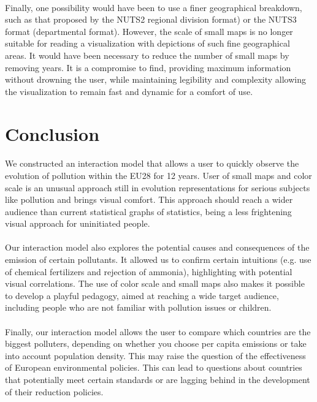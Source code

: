 \documentclass[preprint,journal]{vgtc}       %
\begin{document}
\paragraph{}
Finally, one possibility would have been to use a finer geographical breakdown, such as that proposed by the NUTS2 regional division format) or the NUTS3 format (departmental format). However, the scale of small maps is no longer suitable for reading a visualization with depictions of such fine geographical areas. It would have been necessary to reduce the number of small maps by removing years. It is a compromise to find, providing maximum information without drowning the user, while maintaining legibility and complexity allowing the visualization to remain fast and dynamic for a comfort of use.


\section{Conclusion}

\paragraph{}
We constructed an interaction model that allows a user to quickly observe the evolution of pollution within the EU28 for 12 years. User of small maps and color scale is an unusual approach still in evolution representations for serious subjects like pollution and brings visual comfort. This approach should reach a wider audience than current statistical graphs of statistics, being a less frightening visual approach for uninitiated people.

\paragraph{}
Our interaction model also explores the potential causes and consequences of the emission of certain pollutants. It allowed us to confirm certain intuitions (e.g. use of chemical fertilizers and rejection of ammonia), highlighting with potential visual correlations. The use of color scale and small maps also makes it possible to develop a playful pedagogy, aimed at reaching a wide target audience, including people who are not familiar with pollution issues or children. 

\paragraph{}
Finally, our interaction model allows the user to compare which countries are the biggest polluters, depending on whether you choose per capita emissions or take into account population density. This may raise the question of the effectiveness of European environmental policies. This can lead to questions about countries that potentially meet certain standards or are lagging behind in the development of their reduction policies.
\end{document}
